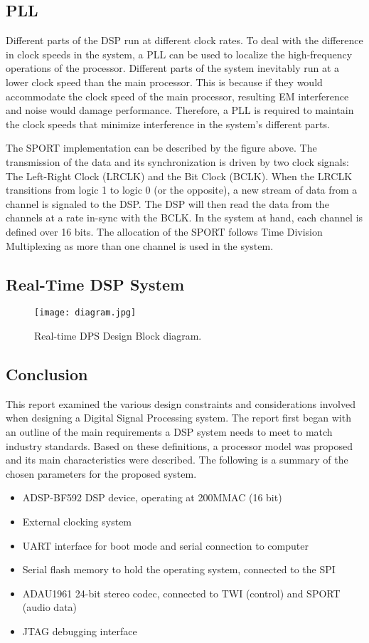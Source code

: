 \subsection{PLL}
Different parts of the DSP run at different clock rates. To deal with the difference in clock speeds in the system, a PLL can be used to localize the high-frequency operations of the processor. Different parts of the system inevitably run at a lower clock speed than the main processor. This is because if they would accommodate the clock speed of the main processor, resulting EM interference and noise would damage performance. Therefore, a PLL is required to maintain the clock speeds that minimize interference in the system’s different parts. 


The SPORT implementation can be described by the figure above. The transmission of the data and its synchronization is driven by two clock signals: The Left-Right Clock (LRCLK) and the Bit Clock (BCLK). When the LRCLK transitions from logic 1 to logic 0 (or the opposite), a new stream of data from a channel is signaled to the DSP. The DSP will then read the data from the channels at a rate in-sync with the BCLK. In the system at hand, each channel is defined over 16 bits. The allocation of the SPORT follows Time Division Multiplexing as more than one channel is used in the system. 


\subsection{Real-Time DSP System}

\begin{figure}[h!]
	\centering
	\texttt{[image: diagram.jpg]}
	\caption{Real-time DPS Design Block diagram.}
	\label{fig:block}
\end{figure}



\subsection{Conclusion}
This report examined the various design constraints and considerations involved when designing a Digital Signal Processing system. The report first began with an outline of the main requirements a DSP system needs to meet to match industry standards. Based on these definitions, a processor model was proposed and its main characteristics were described. The following is a summary of the chosen parameters for the proposed system. 


\begin{itemize}
	\setlength\itemsep{0.1em}
	\item ADSP-BF592 DSP device, operating at 200MMAC (16 bit)
	\item External clocking system 
	\item UART interface for boot mode and serial connection to computer 
	\item Serial flash memory to hold the operating system, connected to the SPI 
	\item ADAU1961 24-bit stereo codec, connected to TWI (control) and SPORT (audio data)
	\item JTAG debugging interface
\end{itemize}

